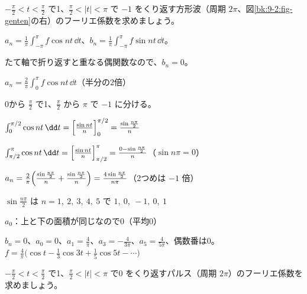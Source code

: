 \begin{reidai}[偶関数の方形波]
$-\frac{\pi}{2}<t<\frac{\pi}{2}$ で1、$\frac{\pi}{2}<|t|<\pi$ で $-1$ をくり返す方形波（周期 $2\pi$、図\ref{bk:9-2:fig-genten}の右）のフーリエ係数を求めましょう。\par
\kangaekata {}\par
{}\enspace $a_n=\frac{1}{\pi}\int_{-\pi}^{\pi}f\cos nt\,\dd t$、$b_n=\frac{1}{\pi}\int_{-\pi}^{\pi}f\sin nt\,\dd t$。\par
{}\enspace たて軸で折り返すと重なる偶関数なので、$b_n=0$。\par
\kixca $a_n=\frac{2}{\pi}\int_0^{\pi}f\cos nt\,\dd t$（半分の2倍）\par
{}\enspace 0から $\frac{\pi}{2}$ で1、$\frac{\pi}{2}$ から $\pi$ で $-1$ に分ける。\par
\shiki\kixcs $\int_0^{\pi/2}\cos nt\,\dd t=\Bigl[\frac{\sin nt}{n}\Bigr]_0^{\pi/2}=\frac{\sin\frac{n\pi}{2}}{n}$\par
\kixca $\int_{\pi/2}^{\pi}\cos nt\,\dd t=\Bigl[\frac{\sin nt}{n}\Bigr]_{\pi/2}^{\pi}=\frac{0-\sin\frac{n\pi}{2}}{n}$\quad （$\sin n\pi=0$）\par
\kixca $a_n=\frac{2}{\pi}\Bigl(\frac{\sin\frac{n\pi}{2}}{n}+\frac{\sin\frac{n\pi}{2}}{n}\Bigr)=\frac{4\sin\frac{n\pi}{2}}{n\pi}$\quad （2つめは $-1$ 倍）\par
\kixca $\sin\frac{n\pi}{2}$ は $n=1,\ 2,\ 3,\ 4,\ 5$ で $1,\ 0,\ -1,\ 0,\ 1$\par
\kixca $a_0$：上と下の面積が同じなので0（平均0）\par
\kotae $b_n=0$、$a_0=0$、$a_1=\frac{4}{\pi}$、$a_3=-\frac{4}{3\pi}$、$a_5=\frac{4}{5\pi}$、偶数番は0。\\
\hspace*{2.6\zw}$f=\frac{4}{\pi}\bigl(\cos t-\frac13\cos3t+\frac15\cos5t-\cdots\bigr)$
\end{reidai}

\begin{jibun}
$-\frac{\pi}{2}<t<\frac{\pi}{2}$ で1、$\frac{\pi}{2}<|t|<\pi$ で0 をくり返すパルス（周期 $2\pi$）のフーリエ係数を求めましょう。
\end{jibun}

